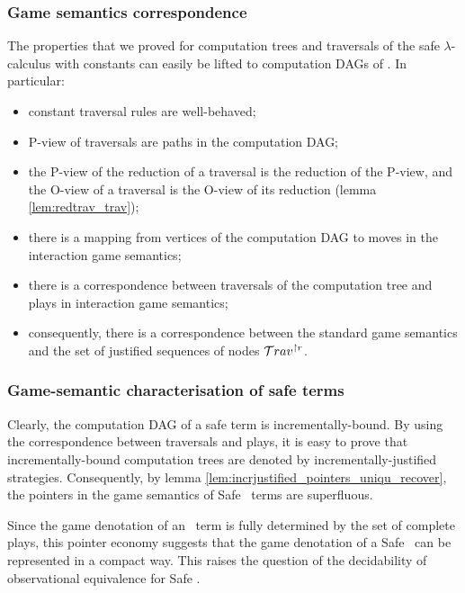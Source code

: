 \subsubsection{Game semantics correspondence}
The properties that we proved for computation trees and traversals
of the safe $\lambda$-calculus with constants can easily be lifted
to computation DAGs of \ialgol. In particular:
\begin{itemize}
\item constant traversal rules are well-behaved;
\item P-view of traversals are paths in the computation DAG;
\item the P-view of the reduction of a traversal is the reduction of the P-view,
and the O-view of a traversal is the O-view of its reduction (lemma
\ref{lem:redtrav_trav});
\item there is a mapping from vertices of the computation DAG to moves in the interaction game semantics;
\item there is a correspondence between traversals of the computation tree and plays in interaction game semantics;
\item consequently, there is a correspondence between the standard game semantics and
the set of justified sequences of nodes $\mathcal{T}rav^{\upharpoonright
r}$.
\end{itemize}

\subsubsection{Game-semantic characterisation of safe terms}
Clearly, the computation DAG of a safe term is incrementally-bound.
By using the correspondence between traversals and plays, it is easy
to prove that incrementally-bound computation trees are denoted by
incrementally-justified strategies. Consequently, by lemma
\ref{lem:incrjustified_pointers_uniqu_recover}, the pointers in the
game semantics of Safe \ialgol\ terms are superfluous.

Since the game denotation of an \ialgol\ term is fully determined by
the set of complete plays, this pointer economy suggests that the
game denotation of a Safe \ialgol\ can be represented in a compact
way. This raises the question of the decidability of observational
equivalence for Safe \ialgol.

